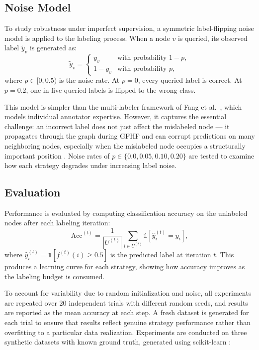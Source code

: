 \documentclass[12pt]{article}
\begin{document}
\subsection{Noise Model}

To study robustness under imperfect supervision, a symmetric label-flipping noise model is applied to the labeling process. When a node $v$ is queried, its observed label $\tilde{y}_v$ is generated as:
\[
\tilde{y}_v =
\begin{cases}
y_v & \text{with probability } 1 - p, \\
1 - y_v & \text{with probability } p,
\end{cases}
\]
where $p \in [0, 0.5)$ is the noise rate. At $p = 0$, every queried label is correct. At $p = 0.2$, one in five queried labels is flipped to the wrong class.

This model is simpler than the multi-labeler framework of Fang et al.\ \cite{Fang2014}, which models individual annotator expertise. However, it captures the essential challenge: an incorrect label does not just affect the mislabeled node --- it propagates through the graph during GFHF and can corrupt predictions on many neighboring nodes, especially when the mislabeled node occupies a structurally important position \cite{Zhu2003}. Noise rates of $p \in \{0.0, 0.05, 0.10, 0.20\}$ are tested to examine how each strategy degrades under increasing label noise.

\subsection{Evaluation}

Performance is evaluated by computing classification accuracy on the unlabeled nodes after each labeling iteration:
\[
\text{Acc}^{(t)} = \frac{1}{|U^{(t)}|}\sum_{i \in U^{(t)}} \mathbb{1}\!\left[\hat{y}_i^{(t)} = y_i\right],
\]
where $\hat{y}_i^{(t)} = \mathbb{1}[f^{(t)}(i) \geq 0.5]$ is the predicted label at iteration $t$. This produces a learning curve for each strategy, showing how accuracy improves as the labeling budget is consumed.

To account for variability due to random initialization and noise, all experiments are repeated over 20 independent trials with different random seeds, and results are reported as the mean accuracy at each step. A fresh dataset is generated for each trial to ensure that results reflect genuine strategy performance rather than overfitting to a particular data realization. Experiments are conducted on three synthetic datasets with known ground truth, generated using scikit-learn \cite{Pedregosa2011}:
\end{document}
